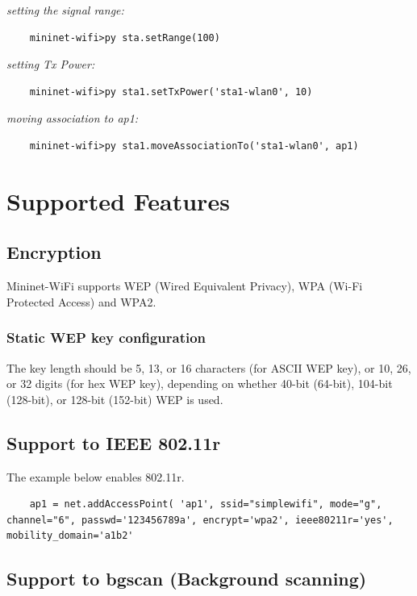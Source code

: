 \noindent \textit{setting the signal range:}
\begin{verbatim}
    mininet-wifi>py sta.setRange(100)
\end{verbatim}

\noindent \textit{setting Tx Power:}
\begin{verbatim}
    mininet-wifi>py sta1.setTxPower('sta1-wlan0', 10)
\end{verbatim}

\noindent \textit{moving association to ap1:}
\begin{verbatim}
    mininet-wifi>py sta1.moveAssociationTo('sta1-wlan0', ap1)
\end{verbatim}

\section{Supported Features}

\subsection{Encryption}
Mininet-WiFi supports WEP (Wired Equivalent Privacy), WPA (Wi-Fi Protected Access) and WPA2.

\subsubsection{Static WEP key configuration}
The key length should be 5, 13, or 16 characters (for ASCII WEP key), or 10, 26, or 32 digits (for hex WEP key), depending on whether 40-bit (64-bit), 104-bit (128-bit), or 128-bit (152-bit) WEP is used.

\subsection{Support to IEEE 802.11r}

The example below enables 802.11r.

\begin{verbatim}
    ap1 = net.addAccessPoint( 'ap1', ssid="simplewifi", mode="g", channel="6", passwd='123456789a', encrypt='wpa2', ieee80211r='yes', mobility_domain='a1b2'
\end{verbatim}

\subsection{Support to bgscan (Background scanning)}

